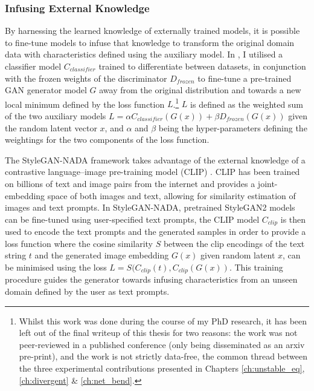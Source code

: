 \subsubsection{Infusing External Knowledge} 

By harnessing the learned knowledge of externally trained models, it is possible to fine-tune models to infuse that knowledge to transform the original domain data with characteristics defined using the auxiliary model. 
In \citep{broad2019transforming}, I utilised a classifier model $C_{classifier}$ trained to differentiate between datasets, in conjunction with the frozen weights of the discriminator $D_{frozen}$ to fine-tune a pre-trained GAN generator model $G$ away from the original distribution and towards a new local minimum defined by the loss function $L$.\footnote{Whilst this work was done during the course of my PhD research, it has been left out of the final writeup of this thesis for two reasons: the work was not peer-reviewed in a published conference (only being disseminated as an arxiv pre-print), and the work is not strictly data-free, the common thread between the three experimental contributions presented in Chapters \ref{ch:unstable_eq}, \ref{ch:divergent} \& \ref{ch:net_bend}.}
$L$ is defined as the weighted sum of the two auxiliary models $L = \alpha C_{classifier}(G(x)) + \beta D_{frozen}(G(x))$ given the random latent vector $x$, and $\alpha$ and $\beta$ being the hyper-parameters defining the weightings for the two components of the loss function. 

The StyleGAN-NADA framework \citep{gal2021stylegan} takes advantage of the external knowledge of a contrastive language–image pre-training model (CLIP) \citep{radford2021learning}. 
CLIP has been trained on billions of text and image pairs from the internet and provides a joint-embedding space of both images and text, allowing for similarity estimation of images and text prompts. 
In StyleGAN-NADA, pretrained StyleGAN2 models \citep{karras2019analyzing} can be fine-tuned using user-specified text prompts, the CLIP model $C_{clip}$ is then used to encode the text prompts and the generated samples in order to provide a loss function where the cosine similarity $S$ between the clip encodings of the text string $t$ and the generated image embedding $G(x)$ given random latent $x$, can be minimised using the loss $L = S(C_{clip}(t), C_{clip}(G(x))$. 
This training procedure guides the generator towards infusing characteristics from an unseen domain defined by the user as text prompts.

